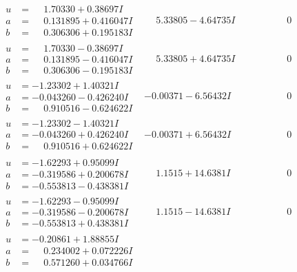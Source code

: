 \documentclass[1p]{elsarticle_modified}
\theoremstyle{definition}
\begin{document}
$$\begin{array}{c|c|c}
\begin{aligned}
u &= \phantom{-}1.70330 + 0.38697 I \\
a &= \phantom{-}0.131895 + 0.416047 I \\
b &= \phantom{-}0.306306 + 0.195183 I\end{aligned}
 & \phantom{-}5.33805 - 4.64735 I & \phantom{-0.000000 } 0 \\ \hline\begin{aligned}
u &= \phantom{-}1.70330 - 0.38697 I \\
a &= \phantom{-}0.131895 - 0.416047 I \\
b &= \phantom{-}0.306306 - 0.195183 I\end{aligned}
 & \phantom{-}5.33805 + 4.64735 I & \phantom{-0.000000 } 0 \\ \hline\begin{aligned}
u &= -1.23302 + 1.40321 I \\
a &= -0.043260 - 0.426240 I \\
b &= \phantom{-}0.910516 - 0.624622 I\end{aligned}
 & -0.00371 - 6.56432 I & \phantom{-0.000000 } 0 \\ \hline\begin{aligned}
u &= -1.23302 - 1.40321 I \\
a &= -0.043260 + 0.426240 I \\
b &= \phantom{-}0.910516 + 0.624622 I\end{aligned}
 & -0.00371 + 6.56432 I & \phantom{-0.000000 } 0 \\ \hline\begin{aligned}
u &= -1.62293 + 0.95099 I \\
a &= -0.319586 + 0.200678 I \\
b &= -0.553813 - 0.438381 I\end{aligned}
 & \phantom{-}1.1515 + 14.6381 I & \phantom{-0.000000 } 0 \\ \hline\begin{aligned}
u &= -1.62293 - 0.95099 I \\
a &= -0.319586 - 0.200678 I \\
b &= -0.553813 + 0.438381 I\end{aligned}
 & \phantom{-}1.1515 - 14.6381 I & \phantom{-0.000000 } 0 \\ \hline\begin{aligned}
u &= -0.20861 + 1.88855 I \\
a &= \phantom{-}0.234002 + 0.072226 I \\
b &= \phantom{-}0.571260 + 0.034766 I\end{aligned}

\end{array}$$
\end{document}
